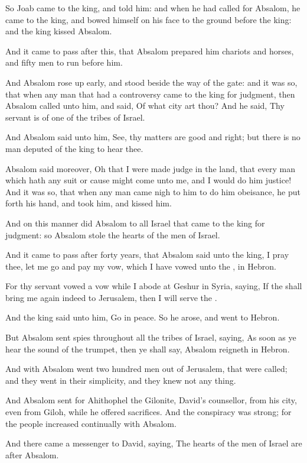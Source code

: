\Verse So Joab came to the king, and told him: and when he had called for Absalom, he came to the king, and bowed himself on his face to the ground before the king: and the king kissed Absalom.


\Chapter
\Verse And it came to pass after this, that Absalom prepared him chariots and horses, and fifty men to run before him.

\Verse And Absalom rose up early, and stood beside the way of the gate: and it was so, that when any man that had a controversy came to the king for judgment, then Absalom called unto him, and said, Of what city art thou? And he said, Thy servant is of one of the tribes of Israel.

\Verse And Absalom said unto him, See, thy matters are good and right; but there is no man deputed of the king to hear thee.

\Verse Absalom said moreover, Oh that I were made judge in the land, that every man which hath any suit or cause might come unto me, and I would do him justice!  \Verse And it was so, that when any man came nigh to him to do him obeisance, he put forth his hand, and took him, and kissed him.

\Verse And on this manner did Absalom to all Israel that came to the king for judgment: so Absalom stole the hearts of the men of Israel.

\Verse And it came to pass after forty years, that Absalom said unto the king, I pray thee, let me go and pay my vow, which I have vowed unto the \LORD, in Hebron.

\Verse For thy servant vowed a vow while I abode at Geshur in Syria, saying, If the \LORD shall bring me again indeed to Jerusalem, then I will serve the \LORD.

\Verse And the king said unto him, Go in peace. So he arose, and went to Hebron.

\Verse But Absalom sent spies throughout all the tribes of Israel, saying, As soon as ye hear the sound of the trumpet, then ye shall say, Absalom reigneth in Hebron.

\Verse And with Absalom went two hundred men out of Jerusalem, that were called; and they went in their simplicity, and they knew not any thing.

\Verse And Absalom sent for Ahithophel the Gilonite, David's counsellor, from his city, even from Giloh, while he offered sacrifices. And the conspiracy was strong; for the people increased continually with Absalom.

\Verse And there came a messenger to David, saying, The hearts of the men of Israel are after Absalom.

